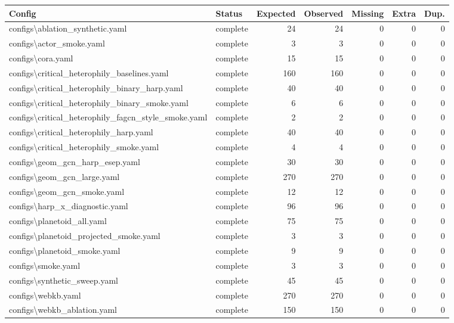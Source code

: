 \begin{tabular}{llrrrrr}
\toprule
Config & Status & Expected & Observed & Missing & Extra & Dup. \\
\midrule
configs\textbackslash{}ablation\_synthetic.yaml & complete & 24 & 24 & 0 & 0 & 0 \\
configs\textbackslash{}actor\_smoke.yaml & complete & 3 & 3 & 0 & 0 & 0 \\
configs\textbackslash{}cora.yaml & complete & 15 & 15 & 0 & 0 & 0 \\
configs\textbackslash{}critical\_heterophily\_baselines.yaml & complete & 160 & 160 & 0 & 0 & 0 \\
configs\textbackslash{}critical\_heterophily\_binary\_harp.yaml & complete & 40 & 40 & 0 & 0 & 0 \\
configs\textbackslash{}critical\_heterophily\_binary\_smoke.yaml & complete & 6 & 6 & 0 & 0 & 0 \\
configs\textbackslash{}critical\_heterophily\_fagcn\_style\_smoke.yaml & complete & 2 & 2 & 0 & 0 & 0 \\
configs\textbackslash{}critical\_heterophily\_harp.yaml & complete & 40 & 40 & 0 & 0 & 0 \\
configs\textbackslash{}critical\_heterophily\_smoke.yaml & complete & 4 & 4 & 0 & 0 & 0 \\
configs\textbackslash{}geom\_gcn\_harp\_esep.yaml & complete & 30 & 30 & 0 & 0 & 0 \\
configs\textbackslash{}geom\_gcn\_large.yaml & complete & 270 & 270 & 0 & 0 & 0 \\
configs\textbackslash{}geom\_gcn\_smoke.yaml & complete & 12 & 12 & 0 & 0 & 0 \\
configs\textbackslash{}harp\_x\_diagnostic.yaml & complete & 96 & 96 & 0 & 0 & 0 \\
configs\textbackslash{}planetoid\_all.yaml & complete & 75 & 75 & 0 & 0 & 0 \\
configs\textbackslash{}planetoid\_projected\_smoke.yaml & complete & 3 & 3 & 0 & 0 & 0 \\
configs\textbackslash{}planetoid\_smoke.yaml & complete & 9 & 9 & 0 & 0 & 0 \\
configs\textbackslash{}smoke.yaml & complete & 3 & 3 & 0 & 0 & 0 \\
configs\textbackslash{}synthetic\_sweep.yaml & complete & 45 & 45 & 0 & 0 & 0 \\
configs\textbackslash{}webkb.yaml & complete & 270 & 270 & 0 & 0 & 0 \\
configs\textbackslash{}webkb\_ablation.yaml & complete & 150 & 150 & 0 & 0 & 0 \\

\end{tabular}
